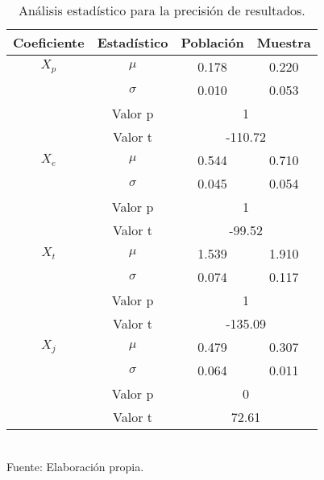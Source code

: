 \documentclass[12pt]{article} %
\begin{document}
\begin{table}[H]
    \caption{Análisis estadístico para la precisión de resultados.}
    \vspace{0.2cm}
    \centering
    \begin{tabular}{|c|c|c|c|}
    \hline
    \textbf{Coeficiente} & \textbf{Estadístico} & \textbf{Población} & \textbf{Muestra} \\ \hline
    $X_p$ & \multicolumn{1}{|c|}{\(\mu\)} & 0.178 & 0.220 \\ \cline{2-4}
    & \multicolumn{1}{|c|}{\(\sigma\)} & 0.010 & 0.053 \\ \cline{2-4}
    & \multicolumn{1}{|c|}{Valor p} & \multicolumn{2}{|c|}{1} \\ \cline{2-4}
    & \multicolumn{1}{|c|}{Valor t} & \multicolumn{2}{|c|}{-110.72} \\ \hline
    
    $X_e$ & \multicolumn{1}{|c|}{\(\mu\)} & 0.544 & 0.710 \\ \cline{2-4}
    & \multicolumn{1}{|c|}{\(\sigma\)} & 0.045 & 0.054 \\ \cline{2-4}
    & \multicolumn{1}{|c|}{Valor p} & \multicolumn{2}{|c|}{1} \\ \cline{2-4}
    & \multicolumn{1}{|c|}{Valor t} & \multicolumn{2}{|c|}{-99.52} \\ \hline
    
    $X_t$ & \multicolumn{1}{|c|}{\(\mu\)} & 1.539 & 1.910 \\ \cline{2-4}
    & \multicolumn{1}{|c|}{\(\sigma\)} & 0.074 & 0.117 \\ \cline{2-4}
    & \multicolumn{1}{|c|}{Valor p} & \multicolumn{2}{|c|}{1} \\ \cline{2-4}
    & \multicolumn{1}{|c|}{Valor t} & \multicolumn{2}{|c|}{-135.09} \\ \hline
    
    $X_j$ & \multicolumn{1}{|c|}{\(\mu\)} & 0.479 & 0.307 \\ \cline{2-4}
    & \multicolumn{1}{|c|}{\(\sigma\)} & 0.064 & 0.011 \\ \cline{2-4}
    & \multicolumn{1}{|c|}{Valor p} & \multicolumn{2}{|c|}{0} \\ \cline{2-4}
    & \multicolumn{1}{|c|}{Valor t} & \multicolumn{2}{|c|}{72.61} \\ \hline
    \end{tabular}
    \label{Precision_Resultados}
    \vspace{0.2cm}
    \\Fuente: Elaboración propia.
\end{table}
\end{document}
